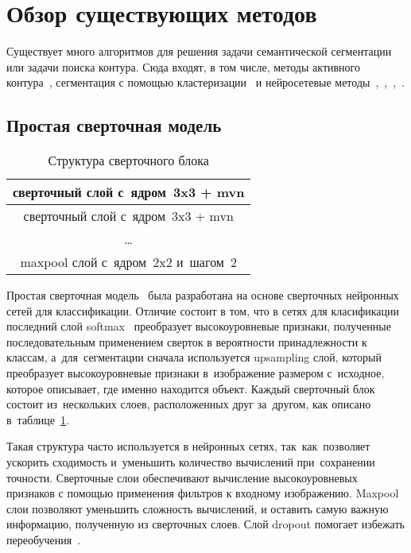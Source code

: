 \section{Обзор существующих методов}

Существует много алгоритмов для решения задачи семантической сегментации или задачи поиска контура. Сюда входят, в том числе, методы активного контура~\cite{snakes}, сегментация с помощью кластеризации~\cite{clustering_segm} и нейросетевые методы~\cite{fcn},~\cite{unet},~\cite{gridnet},~\cite{deeplab}.

\subsection{Простая сверточная модель}

\begin{table}[b]
  \begin{center}
    \caption{Структура сверточного блока} \label{tab:conv_block}
    \begin{tabular}{ c }
      \hline
      сверточный слой с~ядром~3x3 + mvn     \\ \hline
      сверточный слой с~ядром~3x3 + mvn     \\ \hline
      \dots                                 \\ \hline
      maxpool слой с~ядром~2x2 и~шагом~2    \\ 
      \hline
    \end{tabular}
  \end{center}
\end{table}

\begin{samepage}
Простая сверточная модель~\cite{fcn_1_layer_upsample} была разработана на основе сверточных нейронных сетей для классификации. Отличие состоит в том, что в сетях для класификации последний слой softmax~\cite{classification_loss} преобразует высокоуровневые признаки, полученные последовательным применением сверток в вероятности принадлежности к классам, а~для~сегментации сначала используется upsampling слой, который преобразует высокоуровневые признаки в~изображение размером с~исходное, которое описывает, где именно находится объект. Каждый сверточный блок состоит из~нескольких слоев, расположенных друг за~другом, как описано в~таблице~\ref{tab:conv_block}.

Такая структура часто используется в нейронных сетях, так~как~позволяет ускорить сходимость и~уменьшить количество вычислений при~сохранении точности. Сверточные слои обеспечивают вычисление высокоуровневых признаков с помощью применения фильтров к входному изображению. Maxpool слои позволяют уменьшить сложность вычислений, и оставить самую важную информацию, полученную из сверточных слоев. Слой dropout помогает избежать переобучения~\cite{dropout}. 
\end{samepage}

